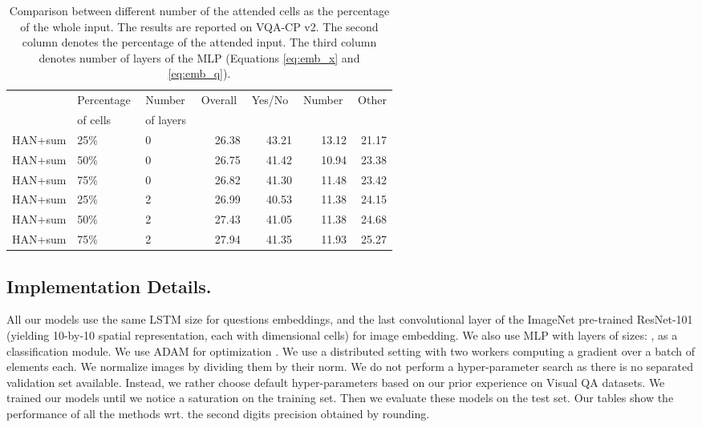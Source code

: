\begin{table*}[tb]
\begin{center}
\begin{tabular}{lllrrrr}
\toprule
 & Percentage\,\, & Number\,\, & Overall\,\, & Yes/No\,\, & Number\,\, & Other \\
 & of cells\,\, & of layers\,\,  & & & & \\
 \cmidrule(ll){1-3}\cmidrule(lr){4-7}
 HAN+sum & 25\% & 0 & 26.38 & 43.21 & 13.12 & 21.17 \\
 HAN+sum & 50\% & 0 & 26.75 & 41.42 & 10.94 & 23.38 \\
 HAN+sum & 75\%   & 0 & 26.82 & 41.30 & 11.48 & 23.42 \\
\midrule
 HAN+sum & 25\% & 2 & 26.99 & 40.53 & 11.38 & 24.15 \\
 HAN+sum & 50\% & 2 & 27.43 & 41.05 & 11.38 & 24.68 \\
 HAN+sum & 75\% & 2 & 27.94 & 41.35 & 11.93 & 25.27 \\
\bottomrule
\end{tabular}
\end{center}
\caption{
Comparison between different number of the attended 
cells as the percentage of the whole input. The results are reported on VQA-CP v2. The second column denotes the 
percentage of the attended input.
The third column denotes number of layers of the MLP (Equations \ref{eq:emb_x} and \ref{eq:emb_q}).
}
\label{table:han-sum-attention_numbers}
\end{table*}

\subsection{Implementation Details.}
All our models use the same LSTM size  for questions embeddings, and the last convolutional layer of the ImageNet pre-trained ResNet-101 \cite{he2015deep} (yielding 10-by-10 spatial representation, each with  dimensional cells) for image embedding. We also use MLP with  layers of sizes: , as a classification module. We use ADAM for optimization \cite{kingma2014adam}. We use a distributed setting with two workers computing a gradient over a batch of  elements each. We normalize images by dividing them by their norm. We do not perform a hyper-parameter search as there is no separated validation set available. Instead, we rather choose default hyper-parameters based on our prior experience on Visual QA datasets. We trained our models until we notice a saturation on the training set. Then we evaluate these models on the test set. Our tables show the performance of all the methods wrt. the second digits precision obtained by rounding.

